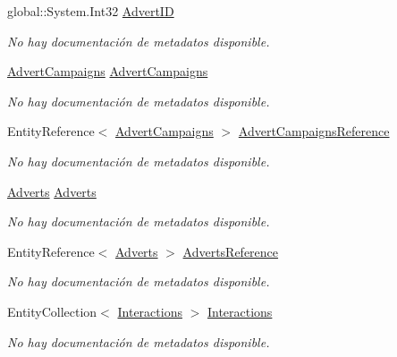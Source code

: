 \begin{DoxyCompactItemize}
global\-::\-System.\-Int32 \hyperlink{class_game_memory_1_1_advert_campaign_details_a322157e3435d7d1ff384fc2fc60b5656}{Advert\-I\-D}
\begin{DoxyCompactList}\small\item\em No hay documentación de metadatos disponible. \end{DoxyCompactList}\item 
\hyperlink{class_game_memory_1_1_advert_campaigns}{Advert\-Campaigns} \hyperlink{class_game_memory_1_1_advert_campaign_details_afbf36c0e9f7113d2b946475ab0ff95df}{Advert\-Campaigns}
\begin{DoxyCompactList}\small\item\em No hay documentación de metadatos disponible. \end{DoxyCompactList}\item 
Entity\-Reference$<$ \hyperlink{class_game_memory_1_1_advert_campaigns}{Advert\-Campaigns} $>$ \hyperlink{class_game_memory_1_1_advert_campaign_details_aa7b63926aba9be6e0a00d3f3f666f13c}{Advert\-Campaigns\-Reference}
\begin{DoxyCompactList}\small\item\em No hay documentación de metadatos disponible. \end{DoxyCompactList}\item 
\hyperlink{class_game_memory_1_1_adverts}{Adverts} \hyperlink{class_game_memory_1_1_advert_campaign_details_a9abbe4e8fd98bab4accdc80aa19afbc9}{Adverts}
\begin{DoxyCompactList}\small\item\em No hay documentación de metadatos disponible. \end{DoxyCompactList}\item 
Entity\-Reference$<$ \hyperlink{class_game_memory_1_1_adverts}{Adverts} $>$ \hyperlink{class_game_memory_1_1_advert_campaign_details_ac0bd4032d1453cc94b31066b61da0e3c}{Adverts\-Reference}
\begin{DoxyCompactList}\small\item\em No hay documentación de metadatos disponible. \end{DoxyCompactList}\item 
Entity\-Collection$<$ \hyperlink{class_game_memory_1_1_interactions}{Interactions} $>$ \hyperlink{class_game_memory_1_1_advert_campaign_details_aed4bd9e4877c0af4c00f36a578213ac0}{Interactions}
\begin{DoxyCompactList}\small\item\em No hay documentación de metadatos disponible. \end{DoxyCompactList}\end{DoxyCompactItemize}


